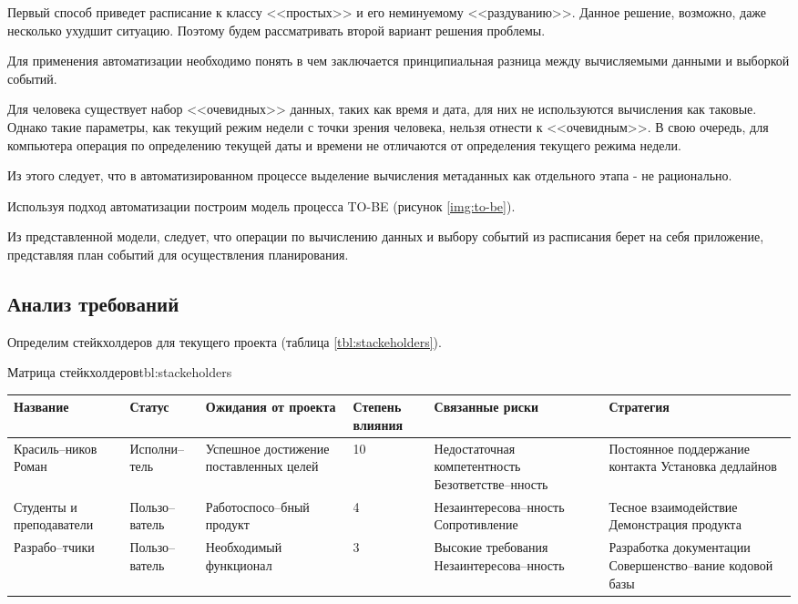 Первый способ приведет расписание к классу <<простых>> и его неминуемому <<раздуванию>>.
Данное решение, возможно, даже несколько ухудшит ситуацию.
Поэтому будем рассматривать второй вариант решения проблемы.

Для применения автоматизации необходимо понять в чем заключается принципиальная разница между вычисляемыми данными и выборкой событий.

Для человека существует набор <<очевидных>> данных, таких как время и дата, для них не используются вычисления как таковые.
Однако такие параметры, как текущий режим недели с точки зрения человека, нельзя отнести к <<очевидным>>.
В свою очередь, для компьютера операция по определению текущей даты и времени не отличаются от определения текущего режима недели.

Из этого следует, что в автоматизированном процессе выделение вычисления метаданных как отдельного этапа - не рационально.

Используя подход автоматизации построим модель процесса TO-BE (рисунок \ref{img:to-be}).


Из представленной модели, следует, что операции по вычислению данных и выбору событий из расписания берет на себя приложение, представляя план событий для осуществления планирования.

\subsection{Анализ требований}

Определим стейкхолдеров для текущего проекта (таблица \ref{tbl:stackeholders}).

\begin{tbl}{Матрица стейкхолдеров}{tbl:stackeholders}
  \begin{tabularx}{\textwidth}{| p{1.6cm} | p{1.5cm} | X | p{1.5cm} | X | X |}
  \hline Название
  & Статус
  & Ожидания от проекта
  & Степень влияния
  & Связанные риски
  & Стратегия \\
  \hline Красиль--ников Роман
  & Исполни--тель
  & Успешное достижение поставленных целей
  & 10
  & Недостаточная компетентность \newline Безответстве--нность
  & Постоянное поддержание контакта \newline Установка дедлайнов \\
  \hline Студенты и преподаватели
  & Пользо--ватель
  & Работоспосо--бный продукт
  & 4
  & Незаинтересова--нность \newline Сопротивление
  & Тесное взаимодействие \newline Демонстрация продукта \\
  \hline Разрабо--тчики
  & Пользо--ватель
  & Необходимый функционал
  & 3
  & Высокие требования \newline Незаинтересова--нность
  & Разработка документации \newline Совершенство--вание кодовой базы \\
  \hline
  \end{tabularx}
\end{tbl}

